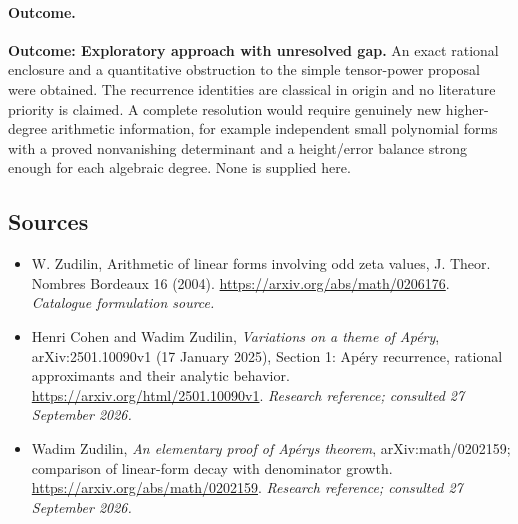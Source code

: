 \documentclass[11pt,a4paper]{article}
\numberwithin{equation}{section}
\begin{document}
\paragraph{Outcome.}
\textbf{Outcome: Exploratory approach with unresolved gap.}
An exact rational enclosure and a quantitative obstruction to the simple tensor-power proposal were obtained. The recurrence identities are classical in origin and no literature priority is claimed. A complete resolution would require genuinely new higher-degree arithmetic information, for example independent small polynomial forms with a proved nonvanishing determinant and a height/error balance strong enough for each algebraic degree. None is supplied here.

\subsection{Sources}
\begin{itemize}\raggedright
\item[\textnormal{[S1]}]\hypertarget{source:184:1}{} W. Zudilin, Arithmetic of linear forms involving odd zeta values, J. Theor. Nombres Bordeaux 16 (2004).
\url{https://arxiv.org/abs/math/0206176}.
{\small\textit{Catalogue formulation source.}}
\item[\textnormal{[E1]}]\hypertarget{extra:184:1}{} Henri Cohen and Wadim Zudilin, \emph{Variations on a theme of Ap\'ery}, arXiv:2501.10090v1 (17 January 2025), Section 1: Ap\'ery recurrence, rational approximants and their analytic behavior.
\url{https://arxiv.org/html/2501.10090v1}.
{\small\textit{Research reference; consulted 27 September 2026.}}
\item[\textnormal{[E2]}]\hypertarget{extra:184:2}{} Wadim Zudilin, \emph{An elementary proof of Ap\'ery\textquotesingle s theorem}, arXiv:math/0202159; comparison of linear-form decay with denominator growth.
\url{https://arxiv.org/abs/math/0202159}.
{\small\textit{Research reference; consulted 27 September 2026.}}
\end{itemize}
\end{document}
